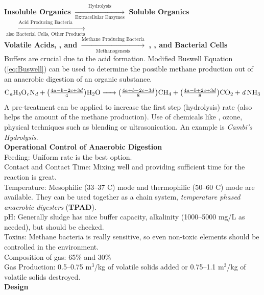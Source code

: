 \documentclass{article}
\numberwithin{equation}{section}
\begin{document}
\begin{enumerate}
\begin{enumerate}
    \end{enumerate}
    \textbf{Insoluble Organics} $\xrightarrow[\text{Extracellular Enzymes}]{\text{Hydrolysis}}$ \textbf{Soluble Organics} $\xrightarrow[\text{also Bacterial Cells, Other Products}]{\text{Acid Producing Bacteria}}$\\ \textbf{Volatile Acids, , and } $\xrightarrow[\text{Methanogenesis}]{\text{Methane Producing Bacteria}}$ \textbf{, , and Bacterial Cells}\\
    Buffers are crucial due to the acid formation.
    Modified Buswell Equation (\ref{eq:Buswell}) can be used to determine the possible methane production out of an anaerobic digestion of an organic substance.
    \begin{equation}
    \scalebox{1}
        {\ce{C_aH_bO_cN_d + $\left(\frac{4a - b - 2c + 3d}{4}\right)$H2O -> $\left(\frac{4a + b - 2c - 3d}{8}\right)$CH4 + $\left(\frac{4a - b + 2c + 3d}{8}\right)$CO2 + $d$NH3}} \label{eq:Buswell}
    \end{equation}
    A pre-treatment can be applied to increase the first step (hydrolysis) rate (also helps the amount of the methane production). Use of chemicals like , ozone, physical techniques such as blending or ultrasonication. An example is \emph{Cambi's Hydrolysis}.\\
    \textbf{Operational Control of Anaerobic Digestion}\\
    Feeding: Uniform rate is the best option.\\
    Contact and Contact Time: Mixing well and providing sufficient time for the reaction is great.\\
    Temperature: Mesophilic (33--37 \textdegree C) mode and thermophilic (50--60 \textdegree C) mode are available. They can be used together as a chain system, \emph{temperature phased anaerobic digesters} (\textbf{TPAD}).\\
    pH: Generally sludge has nice buffer capacity, alkalinity (1000--5000 mg/L as  needed), but should be checked.\\
    Toxins: Methane bacteria is really sensitive, so even non-toxic elements should be controlled in the environment.\\
    Composition of gas: 65\%  and 30\% \\
    Gas Production: 0.5--0.75 m$^3$/kg of volatile solids added or 0.75--1.1 m$^3$/kg of volatile solids destroyed.\\
    \textbf{Design}\\

\end{enumerate}
\end{document}

